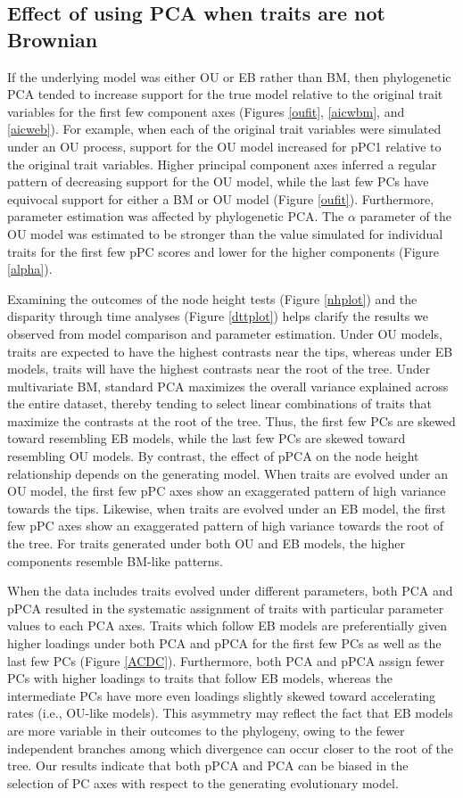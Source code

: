 \documentclass[a4paper,11pt]{article}
\begin{document}
\subsection{Effect of using PCA when traits are not Brownian}
If the underlying model was either OU or EB rather than BM, then phylogenetic PCA tended to increase support for the true model relative to the original trait variables for the first few component axes (Figures \ref{oufit}, \ref{aicwbm}, and \ref{aicweb}). For example, when each of the original trait variables were simulated under an OU process, support for the OU model increased for pPC1 relative to the original trait variables. Higher principal component axes inferred a regular pattern of decreasing support for the OU model, while the last few PCs have equivocal support for either a BM or OU model (Figure \ref{oufit}). Furthermore, parameter estimation was affected by phylogenetic PCA. The $\alpha$ parameter of the OU model was estimated to be stronger than the value simulated for individual traits for the first few pPC scores and lower for the higher components (Figure \ref{alpha}). 

Examining the outcomes of the node height tests (Figure \ref{nhplot}) and the disparity through time analyses (Figure \ref{dttplot}) helps clarify the results we observed from model comparison and parameter estimation. Under OU models, traits are expected to have the highest contrasts near the tips, whereas under EB models, traits will have the highest contrasts near the root of the tree. Under multivariate BM, standard PCA maximizes the overall variance explained across the entire dataset, thereby tending to select linear combinations of traits that maximize the contrasts at the root of the tree. Thus, the first few PCs are skewed toward resembling EB models, while the last few PCs are skewed toward resembling OU models. By contrast, the effect of pPCA on the node height relationship depends on the generating model. When traits are evolved under an OU model, the first few pPC axes show an exaggerated pattern of high variance towards the tips. Likewise, when traits are evolved under an EB model, the first few pPC axes show an exaggerated pattern of high variance towards the root of the tree. For traits generated under both OU and EB models, the higher components resemble BM-like patterns. 

When the data includes traits evolved under different parameters, both PCA and pPCA resulted in the systematic assignment of traits with particular parameter values to each PCA axes. Traits which follow EB models are preferentially given higher loadings under both PCA and pPCA for the first few PCs as well as the last few PCs (Figure \ref{ACDC}). Furthermore, both PCA and pPCA assign fewer PCs with higher loadings to traits that follow EB models, whereas the intermediate PCs have more even loadings slightly skewed toward accelerating rates (i.e., OU-like models). This asymmetry may reflect the fact that EB models are more variable in their outcomes to the phylogeny, owing to the fewer independent branches among which divergence can occur closer to the root of the tree. Our results indicate that both pPCA and PCA can be biased in the selection of PC axes with respect to the generating evolutionary model.
\end{document}
